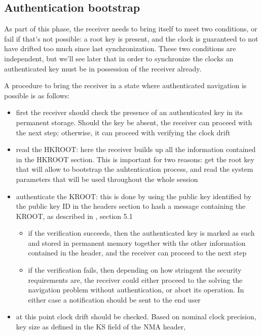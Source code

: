 \subsection{Authentication bootstrap}
As part of this phase, the receiver needs to bring itself to meet two
conditions, or fail if that's not possible: a root key is present, and the clock
is guaranteed to not have drifted too much since last synchronization. These two
conditions are independent, but we'll see later that in order to synchronize the
clocks an authenticated key must be in possession of the receiver already.

A procedure to bring the receiver in a state where authenticated navigation is
possible is as follows:
\begin{itemize}
  \item first the receiver should check the presence of an authenticated key in
    its permanent storage. Should the key be absent, the receiver can proceed
    with the next step; otherwise, it can proceed with verifying the clock drift
  \item read the HKROOT: here the receiver builds up all the information contained
    in the HKROOT section. This is important for two reasons: get the root key
    that will allow to bootstrap the auhtentication process, and read the system
    parameters that will be used throughout the whole session
  \item authenticate the KROOT: this is done by using the public key identified
    by the public key ID in the headers section to hash a message containing the
    KROOT, as described in \cite{osnma}, section 5.1
    \begin{itemize}
      \item if the verification succeeds, then the authenticated key is marked
        as such and stored in permanent memory together with the other
        information contained in the header, and the receiver can proceed to
        the next step
      \item if the verification fails, then depending on how stringent the
        security requirements are, the receiver could either proceed to the
        solving the navigation problem without authentication, or abort its
        operation. In either case a notification should be sent to the end user
    \end{itemize}
  \item at this point clock drift should be checked. Based on nominal clock
    precision, key size as defined in the \textrm{KS} field of the NMA header,

\end{itemize}
